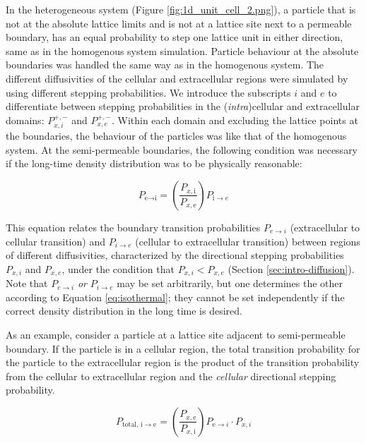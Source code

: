 	In the heterogeneous system (Figure \ref{fig:1d_unit_cell_2.png}), a particle that is not at the absolute lattice limits and is not at a lattice site next to a permeable boundary, has an equal probability to step one lattice unit in either direction, same as in the homogenous system simulation. Particle behaviour at the absolute boundaries was handled the same way as in the homogenous system. The different diffusivities of the cellular and extracellular regions were simulated by using different stepping probabilities. We introduce the subscripts $ i $ and $ e $ to differentiate between stepping probabilities in the (\textsl{intra})cellular and extracellular domains: $ P_{x,i}^{+,-} $ and $ P_{x,e}^{+,-} $. Within each domain and excluding the lattice points at the boundaries, the behaviour of the particles was like that of the homogenous system. At the semi-permeable boundaries, the following condition was necessary if the long-time density distribution was to be physically reasonable:
	
	\begin{equation}
		\label{eq:isothermal}
		P_{\textrm{e}\rightarrow \textrm{i}} = \left( \dfrac{P_{x,\textrm{i}}}{P_{x,\textrm{e}}}\right)  P_{\textrm{i}\rightarrow e}
	\end{equation}
	
	This equation relates the boundary transition probabilities $ P_{e \rightarrow i} $ (extracellular to cellular transition) and $ P_{i \rightarrow e} $ (cellular to extracellular transition) between regions of different diffusivities, characterized by the directional stepping probabilities $ P_{x,i} $ and $ P_{x,e} $, under the condition that $ P_{x,i} < P_{x,e} $ (Section \ref{sec:intro-diffusion}). Note that $ P_{e \rightarrow i} $ \textsl{or} $ P_{i \rightarrow e} $ may be set arbitrarily, but one determines the other according to Equation \ref{eq:isothermal}; they cannot be set independently if the correct density distribution in the long time is desired. 
	
	As an example, consider a particle at a lattice site adjacent to semi-permeable boundary. If the particle is in a cellular region, the total transition probability for the particle to the extracellular region is the product of the transition probability from the cellular to extracellular region and the \textsl{cellular} directional stepping probability.
	
	\begin{equation}
		\label{eq:total_transition_prob}
		P_{\textrm{total},\, \textrm{i} \rightarrow \textrm{e}} = \left( \dfrac{P_{x,\textrm{e}}}{P_{x,\textrm{i}}}\right)  P_{\textrm{e}\rightarrow i} \cdot P_{x,i}
	\end{equation}
	
